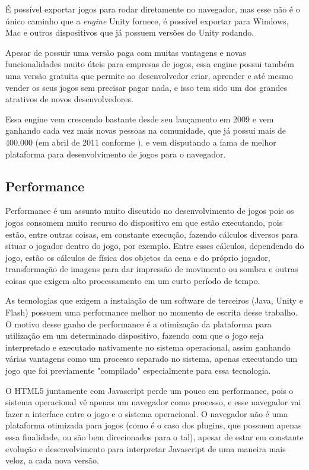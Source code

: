 É possível exportar jogos para rodar diretamente no navegador, mas
esse não é o único caminho que a \textit{engine} Unity fornece, é possível exportar
para Windows, Mac e outros dispositivos que já possuem versões do
Unity rodando.

Apesar de possuir uma versão paga com muitas vantagens e novas
funcionalidades muito úteis para empresas de jogos, essa engine possui
também uma versão gratuita que permite ao desenvolvedor criar,
aprender e até mesmo vender os seus jogos sem precisar pagar nada, e
isso tem sido um dos grandes atrativos de novos desenvolvedores.

Essa engine vem crescendo bastante desde seu lançamento em 2009 e vem ganhando
cada vez mais novas pessoas na comunidade, que já possui mais de
400.000 (em abril de 2011 conforme
), e vem disputando a fama de melhor plataforma
para desenvolvimento de jogos para o navegador.

\subsection{Performance}

Performance é um assunto muito discutido no desenvolvimento de jogos
pois os jogos consomem muito recurso do dispositivo em que estão
executando, pois estão, entre outras coisas, em constante execução, fazendo
cálculos diversos para situar o jogador dentro do jogo, por exemplo.
Entre esses cálculos, dependendo do jogo, estão os cálculos de física dos
objetos da cena e do próprio jogador, transformação de imagens para
dar impressão de movimento ou sombra e outras coisas que exigem alto
processamento em um curto período de tempo.

As tecnologias que exigem a instalação de um software de terceiros
(Java, Unity e Flash) possuem uma performance melhor no
momento de escrita desse trabalho. O motivo desse ganho de performance
é a otimização da plataforma para utilização em um determinado
dispositivo, fazendo com que o jogo seja interpretado e executado
nativamente no sistema operacional, assim ganhando várias
vantagens como um processo separado no sistema, apenas executando um
jogo que foi previamente "compilado" especialmente para essa tecnologia.

O HTML5 juntamente com Javascript perde um pouco em performance, pois
o sistema operacional vê apenas um navegador como processo, e esse
navegador vai fazer a interface entre o jogo e o sistema operacional.
O navegador não é uma plataforma otimizada para jogos (como é o caso
dos plugins, que possuem apenas essa finalidade, ou são bem
direcionados para o tal), apesar de estar em constante evolução e
desenvolvimento para interpretar Javascript de uma maneira mais veloz,
a cada nova versão.


